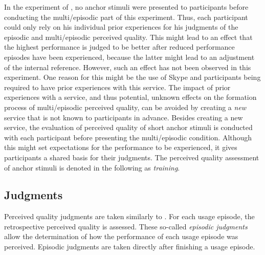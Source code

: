 In the experiment of \citet{moller_single-call_2011}, no anchor stimuli were presented to participants before conducting the multi\-/episodic part of this experiment.
Thus, each participant could only rely on his individual prior experiences for his judgments of the episodic and multi\-/episodic perceived quality.
This might lead to an effect that the highest performance is judged to be better after reduced performance episodes have been experienced, because the latter might lead to an adjustment of the internal reference.
However, such an effect has not been observed in this experiment.
One reason for this might be the use of Skype and participants being required to have prior experiences with this service.
The impact of prior experiences with a service, and thus potential, unknown effects on the formation process of multi\-/episodic perceived quality, can be avoided by creating a \emph{new} service that is not known to participants in advance.
Besides creating a new service, the evaluation of perceived quality of short anchor stimuli is conducted with each participant before presenting the multi\-/episodic condition.
Although this might set expectations for the performance to be experienced, it gives participants a shared basis for their judgments.
The perceived quality assessment of anchor stimuli is denoted in the following as \emph{training}.


\subsection{Judgments}
Perceived quality judgments are taken similarly to \citet{moller_single-call_2011}.
For each usage episode, the retrospective perceived quality is assessed.
These so-called \emph{episodic judgments} allow the determination of how the performance of each usage episode was perceived.
Episodic judgments are taken directly after finishing a usage episode.

